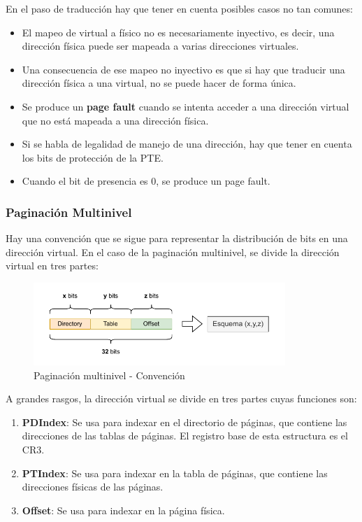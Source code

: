 \documentclass{article}
\begin{document}
En el paso de traducción hay que tener en cuenta posibles casos no tan comunes:
\begin{itemize}
    \item El mapeo de virtual a físico no es necesariamente inyectivo, es decir, una dirección física puede ser mapeada a varias direcciones virtuales.
    \item Una consecuencia de ese mapeo no inyectivo es que si hay que traducir una dirección física a una virtual, no se puede hacer de forma única.
    \item Se produce un \textbf{page fault} cuando se intenta acceder a una dirección virtual que no está mapeada a una dirección física.
    \item Si se habla de legalidad de manejo de una dirección, hay que tener en cuenta los bits de protección de la PTE.
    \item Cuando el bit de presencia es 0, se produce un page fault.
\end{itemize}
\newpage
\subsubsection{Paginación Multinivel}
Hay una convención que se sigue para representar la distribución de bits en una dirección virtual. En el caso de la paginación multinivel, se divide la dirección virtual en tres partes:

\begin{figure}[h]
    \centering
    \includegraphics[width=0.85\textwidth]{src/convencion.pdf}
    \caption{Paginación multinivel - Convención}
\end{figure}

A grandes rasgos, la dirección virtual se divide en tres partes cuyas funciones son:
\begin{enumerate}
    \item \textbf{PDIndex}: Se usa para indexar en el directorio de páginas, que contiene las direcciones de las tablas de páginas. El registro base de esta estructura es el CR3.
    \item \textbf{PTIndex}: Se usa para indexar en la tabla de páginas, que contiene las direcciones físicas de las páginas.
    \item \textbf{Offset}: Se usa para indexar en la página física.
\end{enumerate}
\end{document}
